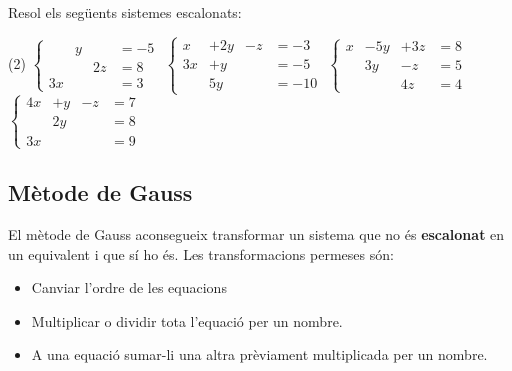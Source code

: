 \begin{mylist}
\exer[1] Resol els seg\"uents sistemes escalonats: 
\begin{tasks}(2)
	\task  $\left\{\begin{array}{llll} &y& &=-5 \\ &&2z&=8 \\ 3x&&&=3 \end{array}\right. $       
	\task  $\left\{\begin{array}{llll} x&+2y&-z&=-3 \\ 3x&+y&&=-5 \\ &5y&&=-10 \end{array}\right. $ 
	\task  $\left\{\begin{array}{llll} x&-5y&+3z&=8 \\ &3y&-z&=5 \\ &&4z&=4 \end{array}\right. $        
	\task  $\left\{\begin{array}{llll} 4x&+y&-z&=7 \\ &2y&&=8 \\ 3x&&&=9 \end{array}\right. $ 
\end{tasks}
\answers[cols=1]{[
		 $x=1; y=-5; z=4$, 
		 $x=-1; y=-2; z=-2$,
		 $x=15; y=2; z=1$, 
		 $x=3; y=4; z=9$ 
]}

\subsection{Mètode de Gauss}

\begin{theorybox}
	El mètode de Gauss aconsegueix transformar un sistema que no és \textbf{escalonat} en un equivalent i que sí ho és. Les transformacions permeses són:
	
	\begin{itemize}
		\item Canviar l'ordre de les equacions
		\item Multiplicar o dividir tota l'equació per un nombre.
		\item A una equació sumar-li una altra prèviament multiplicada per un nombre.
	\end{itemize}
	\begin{minipage}{0.5\textwidth}
		\centering
	\end{minipage}
	\begin{minipage}{0.5\textwidth}
		\centering
	\end{minipage}
	


\end{theorybox}
\end{mylist}
